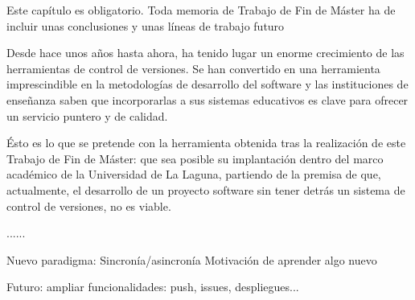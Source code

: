

Este capítulo es obligatorio.
Toda memoria de Trabajo de Fin de Máster ha de incluir unas conclusiones y unas 
líneas de trabajo futuro 

Desde hace unos años hasta ahora, ha tenido lugar un enorme crecimiento de las herramientas de control de versiones. Se han convertido en una herramienta imprescindible en la metodologías de desarrollo del software y las instituciones de enseñanza saben que incorporarlas a sus sistemas educativos es clave para ofrecer un servicio puntero y de calidad.

Ésto es lo que se pretende con la herramienta obtenida tras la realización de este Trabajo de Fin de Máster: que sea posible su implantación dentro del marco académico de la Universidad de La Laguna, partiendo de la premisa de que, actualmente, el desarrollo de un proyecto software sin tener detrás un sistema de control de versiones, no es viable.


......



Nuevo paradigma: Sincronía/asincronía
Motivación de aprender algo nuevo

Futuro:
ampliar funcionalidades: push, issues, despliegues...
